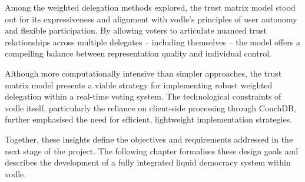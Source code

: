 Among the weighted delegation methods explored, the trust matrix model stood out for its expressiveness and alignment with vodle's principles of user autonomy and flexible participation.  
By allowing voters to articulate nuanced trust relationships across multiple delegates -- including themselves -- the model offers a compelling balance between representation quality and individual control.

Although more computationally intensive than simpler approaches, the trust matrix model presents a viable strategy for implementing robust weighted delegation within a real-time voting system.  
The technological constraints of vodle itself, particularly the reliance on client-side processing through CouchDB, further emphasised the need for efficient, lightweight implementation strategies.

Together, these insights define the objectives and requirements addressed in the next stage of the project.  
The following chapter formalises these design goals and describes the development of a fully integrated liquid democracy system within vodle.

